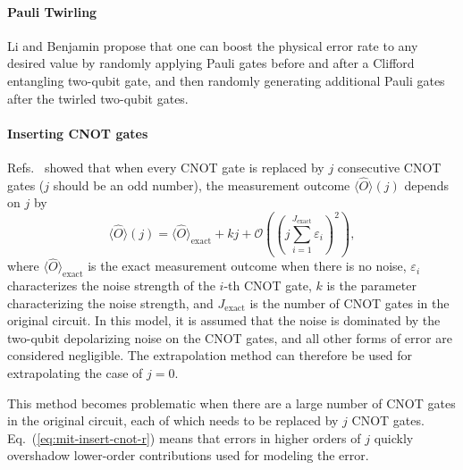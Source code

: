 \paragraph{Pauli Twirling}
Li and Benjamin \cite{liEfficientVariationalQuantum2017} propose that one can boost the physical error rate to any desired value by randomly applying Pauli gates before and after a Clifford entangling two-qubit gate, and then randomly generating additional Pauli gates after the twirled two-qubit gates. %

\paragraph{Inserting CNOT gates}
\label{sec:mit-cnot-boosting}
\newcommand{\ncnot}{\ensuremath{J_\mathrm{exact}}}
Refs.~\cite{dumitrescuCloudQuantumComputing2018, heResourceEfficientZero2020} showed that when every CNOT gate is replaced by $j$ consecutive CNOT gates ($j$ should be an odd number), the measurement outcome $\langle \hat{O} \rangle(j)$ depends on $j$ by
\begin{equation}
    \label{eq:mit-insert-cnot-r}
    \langle \hat{O} \rangle(j)=\langle \hat{O} \rangle_{\mathrm{exact}} +kj+\mathcal{O}\left(\left( j\sum _{i=1}^{\ncnot} \varepsilon _{i}\right)^{2}\right) ,
\end{equation}
where $\langle \hat{O} \rangle_{\mathrm{exact}}$ is the exact measurement outcome when there is no noise, $\varepsilon _{i}$ characterizes the noise strength of the $i$-th CNOT gate, $k$ is the parameter characterizing the noise strength, and $\ncnot$ is the number of CNOT gates in the original circuit. In this model, it is assumed that the noise is dominated by the two-qubit depolarizing noise on the CNOT gates, and all other forms of error are considered negligible. The extrapolation method can therefore be used for extrapolating the case of $j=0$.

This method becomes problematic when there are a large number of CNOT gates in the original circuit, each of which needs to be replaced by $j$ CNOT gates. Eq.~(\ref{eq:mit-insert-cnot-r}) means that errors in higher orders of $j$  quickly overshadow lower-order contributions used for modeling the error. %


